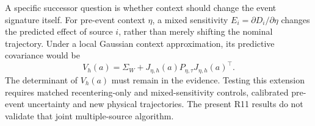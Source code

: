 A specific successor question is whether context should change the event
signature itself. For pre-event context $\eta$, a mixed sensitivity
$E_i=\partial D_i/\partial\eta$ changes the predicted effect of source $i$,
rather than merely shifting the nominal trajectory. Under a local Gaussian
context approximation, its predictive covariance would be
\begin{equation}
 V_h(a)=\Sigma_W+J_{\eta,h}(a)P_{\eta,\tau}J_{\eta,h}(a)^\top.
 \label{eq:context-conditioned-extension}
\end{equation}
The determinant of $V_h(a)$ must remain in the evidence. Testing this
extension requires matched recentering-only and mixed-sensitivity controls,
calibrated pre-event uncertainty and new physical trajectories. The present
R11 results do not validate that joint multiple-source algorithm.

